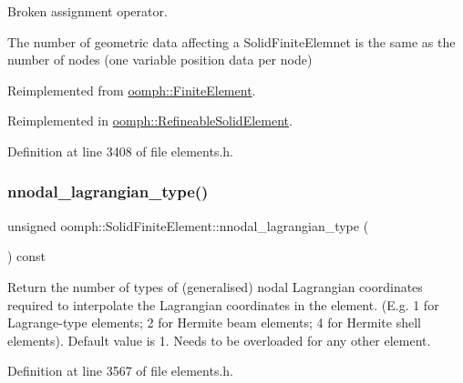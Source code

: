 Broken assignment operator. 

The number of geometric data affecting a Solid\+Finite\+Elemnet is the same as the number of nodes (one variable position data per node) 

Reimplemented from \hyperlink{classoomph_1_1FiniteElement_ae09e3e0c01b6143d511f2626d2ee535c}{oomph\+::\+Finite\+Element}.



Reimplemented in \hyperlink{classoomph_1_1RefineableSolidElement_a690e24cdbd9308da1b9e705fd0340de8}{oomph\+::\+Refineable\+Solid\+Element}.



Definition at line 3408 of file elements.\+h.

\mbox{\label{classoomph_1_1SolidFiniteElement_a4836c2e0228a5affcc0d0f84e16edfe4}} 
\subsubsection{\texorpdfstring{nnodal\+\_\+lagrangian\+\_\+type()}{nnodal\_lagrangian\_type()}}
{\footnotesize\ttfamily unsigned oomph\+::\+Solid\+Finite\+Element\+::nnodal\+\_\+lagrangian\+\_\+type (\begin{DoxyParamCaption}{ }\end{DoxyParamCaption}) const\hspace{0.3cm}{\ttfamily [inline]}}



Return the number of types of (generalised) nodal Lagrangian coordinates required to interpolate the Lagrangian coordinates in the element. (E.\+g. 1 for Lagrange-\/type elements; 2 for Hermite beam elements; 4 for Hermite shell elements). Default value is 1. Needs to be overloaded for any other element. 



Definition at line 3567 of file elements.\+h.

\mbox{\label{classoomph_1_1SolidFiniteElement_a8632178393e76ffcd88888ab96616b1a}} 
